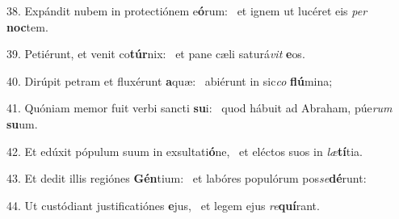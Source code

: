 38. Expándit nubem in protectiónem e\textbf{ó}rum: \ast\  et ignem ut lucéret eis \textit{per} \textbf{noc}tem.\

39. Petiérunt, et venit co\textbf{túr}nix: \ast\  et pane cæli saturá\textit{vit} \textbf{e}os.\

40. Dirúpit petram et fluxérunt \textbf{a}quæ: \ast\  abiérunt in sic\textit{co} \textbf{flú}mina;\

41. Quóniam memor fuit verbi sancti \textbf{su}i: \ast\  quod hábuit ad Abraham, púe\textit{rum} \textbf{su}um.\

42. Et edúxit pópulum suum in exsultati\textbf{ó}ne, \ast\  et eléctos suos in \textit{læ}\textbf{tí}tia.\

43. Et dedit illis regiónes \textbf{Gén}tium: \ast\  et labóres populórum pos\textit{se}\textbf{dé}runt:\

44. Ut custódiant justificatiónes \textbf{e}jus, \ast\  et legem ejus \textit{re}\textbf{quí}rant.\


